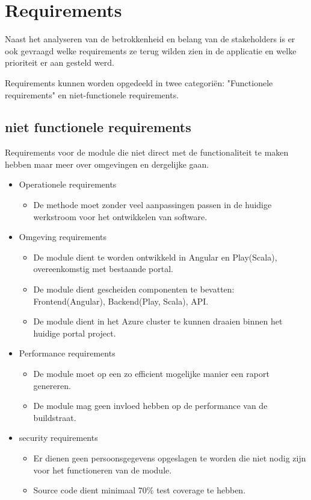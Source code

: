 \section{Requirements}\label{sec:requirements}
Naast het analyseren van de betrokkenheid en belang van de stakeholders is er ook gevraagd welke requirements ze terug wilden zien in de applicatie en welke prioriteit er aan gesteld werd.

Requirements kunnen worden opgedeeld in twee categoriën: "Functionele requirements" en niet-functionele requirements.

\subsection{niet functionele requirements}\label{subsec:niet-functionele-requirements}
Requirements voor de module die niet direct met de functionaliteit te maken hebben maar meer over omgevingen en dergelijke gaan.
\begin{itemize}
    \item Operationele requirements
        \begin{itemize}
            \item De methode moet zonder veel aanpassingen passen in de huidige werkstroom voor het ontwikkelen van software.
        \end{itemize}
    \item Omgeving requirements
        \begin{itemize}
            \item De module dient te worden ontwikkeld in Angular en Play(Scala), overeenkomstig met bestaande portal.
            \item De module dient gescheiden componenten te bevatten: Frontend(Angular), Backend(Play, Scala), API\@.
            \item De module dient in het Azure cluster te kunnen draaien binnen het huidige portal project.
        \end{itemize}
    \item Performance requirements
        \begin{itemize}
            \item De module moet op een zo efficient mogelijke manier een raport genereren.
            \item De module mag geen invloed hebben op de performance van de buildstraat.
        \end{itemize}
    \item security requirements
        \begin{itemize}
            \item Er dienen geen persoonsgegevens opgeslagen te worden die niet nodig zijn voor het functioneren van de module.
            \item Source code dient minimaal 70\% test coverage te hebben.
        \end{itemize}
\end{itemize}

